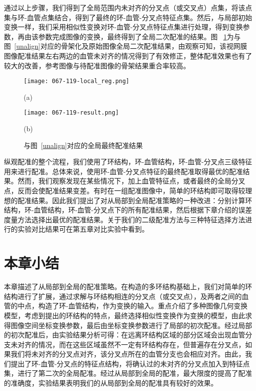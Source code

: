 通过以上步骤，我们得到了全局范围内未对齐的分叉点（或交叉点）点集，将该点集与环-血管点集结合，得到了最终的环-血管-分叉点特征点集。然后，与局部初始变换一样，我们采用相似性变换对环-血管-分叉点特征点集进行处理，得到变换参数，再由该参数完成图像的变换，最终得到了全局二次配准的结果。图 ~\ref{align}为与图~\ref{unalign}对应的骨架化及原始图像全局二次配准结果，由观察可知，该视网膜图像配准结果左右两边的血管未对齐的情况得到了有效修正，整体配准效果也有了较大的改善，参考图像与待配准图像的骨架结果重合率较高。
 \begin{figure}[ht!]
  \centering
  \begin{minipage}[b]{0.48\linewidth} 
      \centering 
  \texttt{[image: 067-119-local\_reg.png]}
        \centerline{(a)}\medskip
    \end{minipage}
  \begin{minipage}[b]{0.48\linewidth} 
      \centering 
  \texttt{[image: 067-119-result.png]}
    \centerline{(b)}\medskip
      \end{minipage}
  \caption{与图~\ref{unalign}对应的全局最终配准结果}
    \label{align}
 \end{figure}
 
 纵观配准的整个流程，我们使用了环结构，环-血管结构，环-血管-分叉点三级特征用来进行配准。总体来说，使用环-血管-分叉点特征的最终配准取得最优的配准结果。然而，我们观察发现在某些情况下，加上血管特征点，或者最终的全局分叉点，反而会使配准结果变差。有时在一组配准图像中，简单的环结构即可取得较理想的配准结果。因此我们提出了对从局部到全局配准策略的一种改进：分别计算环结构，环-血管结构，环-血管-分叉点下的所有配准结果，然后根据下章介绍的误差度量方法选择出最优的配准结果。关于我们的二级配准方法与三种特征选择方法进行的实验对比结果可在第五章对比实验中看到。
 
 \section{本章小结}
 本章描述了从局部到全局的配准策略。在构造的多环结构基础上，我们对简单的环结构进行了扩展，通过求解与环结构相连的分叉点（或交叉点），及两者之间的血管的中点，构造了环-血管结构，作为变换的输入。重点介绍了多种图像几何变换模型，考虑到提出的环结构的特点，最终选择相似性变换作为变换的模型，由此求得图像空间坐标变换参数，最后由坐标变换参数进行了局部的初次配准。经过局部的初次配准后，由实验结果分析可得：在远离环结构区域的部分区域会出现血管分支未对齐的情况，而在这些区域虽然不一定有环结构存在，但普遍存在分叉点，如果我们将未对齐的分叉点对齐，该分叉点所在的血管分支也会相应对齐。由此，我们提出了环-血管-分叉点的特征点结构，将确认过的未对齐的分叉点加入到特征点集，进行了第二次的全局配准。经过从局部到全局的配准，最大限度的提高了配准的准确度，实验结果表明我们的从局部到全局的配准具有较好的效果。     
 
